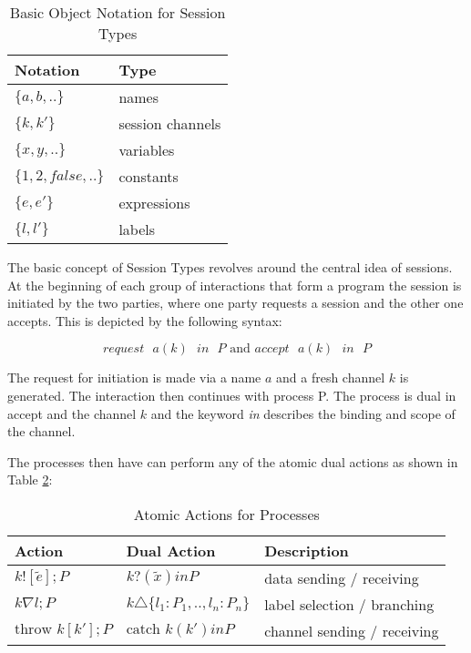 \begin{table}[H]
\center
\caption{Basic Object Notation for Session Types}
\begin{tabular}{|l|l|}
  \hline
  Notation & Type \\
  \hline
  $\{a,b,..\}$ & names \\
  $\{k,k'\}$ & session channels \\
  $\{x,y,..\}$ & variables \\
  $\{1,2,false,..\}$ & constants \\
  $\{e,e'\}$ & expressions \\
  $\{l,l'\}$ & labels \\
  \hline
\end{tabular}
\label{TBobject_notation}
\end{table}

The basic concept of Session Types revolves around the central idea of sessions. At the beginning of each group of interactions that form a program the session is initiated by the two parties, where one party requests a session and the other one accepts. This is depicted by the following syntax:

\[request\mbox{ }a(k)\mbox{ }in\mbox{ }P\mbox{ and }accept\mbox{ }a(k)\mbox{ }in\mbox{ }P\]

The request for initiation is made via a name $a$ and a fresh channel $k$ is generated. The interaction then continues with process P. The process is dual in accept and the channel $k$ and the keyword \textit{in} describes the binding and scope of the channel.

The processes then have can perform any of the atomic dual actions as shown in Table \ref{TBatomic_actions}:

\begin{table}[H]
\center
\caption{Atomic Actions for Processes}
\begin{tabular}{|l|l|l|}
  \hline
   Action & Dual Action & Description \\
   \hline
  $k![\tilde{e}];P$ & $k?(\tilde{x}) in P$ & data sending / receiving \\
  $k\nabla l;P$ & $k\triangle \{l_1:P_1,..,l_n:P_n\}$ & label selection / branching \\
  $\mbox{throw } k[k'];P$ & $\mbox{catch } k(k') in P$ & channel sending / receiving \\
  \hline
\end{tabular}
\label{TBatomic_actions}
\end{table}

